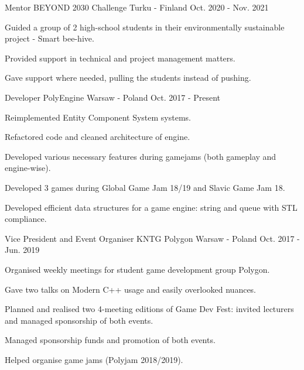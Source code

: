 \begin{cventries}
    \cventry
    {Mentor} %
    {BEYOND 2030 Challenge} %
    {Turku - Finland} %
    {Oct. 2020 - Nov. 2021} %
    {
      \begin{cvitems} %
        \item {Guided a group of 2 high-school students in their environmentally sustainable project - Smart bee-hive.}
        \item {Provided support in technical and project management matters.}
        \item {Gave support where needed, pulling the students instead of pushing.}
      \end{cvitems}
    }

    \cventry
    {Developer} %
    {PolyEngine} %
    {Warsaw - Poland}
    {Oct. 2017 - Present} %
    {
      \begin{cvitems} %
        \item {Reimplemented Entity Component System systems.}
        \item {Refactored code and cleaned architecture of engine.}
        \item {Developed various necessary features during gamejams (both gameplay and engine-wise).}
        \item {Developed 3 games during Global Game Jam 18/19 and Slavic Game Jam 18.}
        \item {Developed efficient data structures for a game engine: string and queue with STL compliance.}
      \end{cvitems}
    }
    \cventry
    {Vice President and Event Organiser} %
    {KNTG Polygon} %
    {Warsaw - Poland} %
    {Oct. 2017 - Jun. 2019} %
    {
      \begin{cvitems} %
        \item {Organised weekly meetings for student game development group Polygon.}
        \item {Gave two talks on Modern C++ usage and easily overlooked nuances.}
        \item {Planned and realised two 4-meeting editions of Game Dev Fest: invited lecturers and managed sponsorship of both events.}
        \item {Managed sponsorship funds and promotion of both events.}
        \item {Helped organise game jams (Polyjam 2018/2019).}
      \end{cvitems}
    }



\end{cventries}
